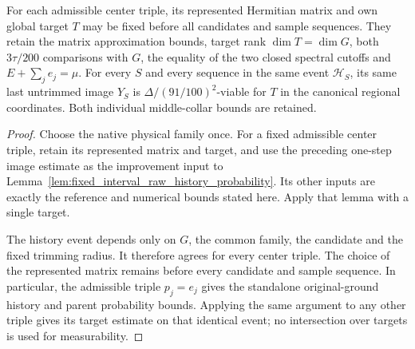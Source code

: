 \begin{lemma}
    For each admissible center triple, its represented Hermitian matrix
    and own global target $T$ may be fixed before all candidates and
    sample sequences. They retain the matrix approximation bounds,
    target rank $\dim T=\dim G$, both $3\tau/200$ comparisons with $G$,
    the equality of the two closed spectral cutoffs and
    $E+\sum_j e_j=\mu$. For every $S$ and every sequence in the same
    event $\mathcal H_S$, its same last untrimmed image $Y_S$ is
    $\Delta/(91/100)^2$-viable for $T$ in the canonical regional
    coordinates. Both individual middle-collar bounds are retained.
\end{lemma}
\begin{proof}\leanok
    Choose the native physical family once. For a fixed admissible
    center triple, retain its represented matrix and target, and use
    the preceding one-step image estimate as the improvement input to
    Lemma~\ref{lem:fixed_interval_raw_history_probability}.
    Its other inputs are exactly the reference and numerical bounds
    stated here. Apply that lemma with a single target.

    The history event depends only on $G$, the common family, the
    candidate and the fixed trimming radius. It therefore agrees for
    every center triple. The choice of the represented matrix remains
    before every candidate and sample sequence. In particular, the
    admissible triple $p_j=e_j$ gives the standalone original-ground
    history and parent probability bounds. Applying the same argument
    to any other triple gives its target estimate on that identical
    event; no intersection over targets is used for measurability.
\end{proof}
